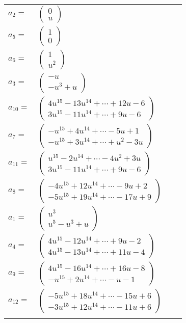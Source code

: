 \documentclass[1p]{elsarticle_modified}
\theoremstyle{definition}
\begin{document}
\begin{tabular}{m{7pt} m{180pt} m{7pt} m{180pt} }
\flushright $a_{2}=$&$\begin{pmatrix}0\\u\end{pmatrix}$ \\
\flushright $a_{5}=$&$\begin{pmatrix}1\\0\end{pmatrix}$ \\
\flushright $a_{6}=$&$\begin{pmatrix}1\\u^2\end{pmatrix}$ \\
\flushright $a_{3}=$&$\begin{pmatrix}- u\\- u^3+u\end{pmatrix}$ \\
\flushright $a_{10}=$&$\begin{pmatrix}4 u^{15}-13 u^{14}+\cdots+12 u-6\\3 u^{15}-11 u^{14}+\cdots+9 u-6\end{pmatrix}$ \\
\flushright $a_{7}=$&$\begin{pmatrix}- u^{15}+4 u^{14}+\cdots-5 u+1\\- u^{15}+3 u^{14}+\cdots+u^2-3 u\end{pmatrix}$ \\
\flushright $a_{11}=$&$\begin{pmatrix}u^{15}-2 u^{14}+\cdots-4 u^2+3 u\\3 u^{15}-11 u^{14}+\cdots+9 u-6\end{pmatrix}$ \\
\flushright $a_{8}=$&$\begin{pmatrix}-4 u^{15}+12 u^{14}+\cdots-9 u+2\\-5 u^{15}+19 u^{14}+\cdots-17 u+9\end{pmatrix}$ \\
\flushright $a_{1}=$&$\begin{pmatrix}u^3\\u^5- u^3+u\end{pmatrix}$ \\
\flushright $a_{4}=$&$\begin{pmatrix}4 u^{15}-12 u^{14}+\cdots+9 u-2\\4 u^{15}-13 u^{14}+\cdots+11 u-4\end{pmatrix}$ \\
\flushright $a_{9}=$&$\begin{pmatrix}4 u^{15}-16 u^{14}+\cdots+16 u-8\\- u^{15}+2 u^{14}+\cdots- u-1\end{pmatrix}$ \\
\flushright $a_{12}=$&$\begin{pmatrix}-5 u^{15}+18 u^{14}+\cdots-15 u+6\\-3 u^{15}+12 u^{14}+\cdots-11 u+6\end{pmatrix}$\\&\end{tabular}
\end{document}
